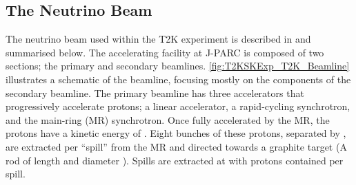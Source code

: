 \subsection{The Neutrino Beam}
\label{subsec:T2KSKExp_T2K_NeutrinoBeam}

The neutrino beam used within the T2K experiment is described in \cite{t2k_det, Abe_2013} and summarised below. The accelerating facility at J-PARC is composed of two sections; the primary and secondary beamlines. \autoref{fig:T2KSKExp_T2K_Beamline} illustrates a schematic of the beamline, focusing mostly on the components of the secondary beamline. The primary beamline has three accelerators that progressively accelerate protons; a linear accelerator, a rapid-cycling synchrotron, and the main-ring (MR) synchrotron. Once fully accelerated by the MR, the protons have a kinetic energy of . Eight bunches of these protons, separated by , are extracted per ``spill'' from the MR and directed towards a graphite target (A rod of length  and diameter ).
Spills are extracted at  with  protons contained per spill.

